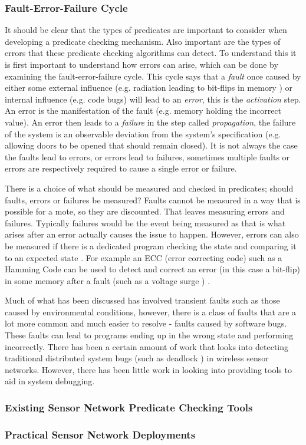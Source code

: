 \subsubsection*{Fault-Error-Failure Cycle}

It should be clear that the types of predicates are important to consider when developing a predicate checking mechanism. Also important are the types of errors that these predicate checking algorithms can detect. To understand this it is first important to understand how errors can arise, which can be done by examining the fault-error-failure cycle. This cycle says that a \emph{fault} once caused by either some external influence (e.g. radiation leading to bit-flips in memory \cite{1017791}) or internal influence (e.g. code bugs) will lead to an \emph{error}, this is the \emph{activation} step. An error is the manifestation of the fault (e.g. memory holding the incorrect value). An error then leads to a \emph{failure} in the step called \emph{propagation}, the failure of the system is an observable deviation from the system's specification (e.g. allowing doors to be opened that should remain closed). It is not always the case the faults lead to errors, or errors lead to failures, sometimes multiple faults or errors are respectively required to cause a single error or failure. \cite{1335465}

There is a choice of what should be measured and checked in predicates; should faults, errors or failures be measured? Faults cannot be measured \cite{?} in a way that is possible for a mote, so they are discounted. That leaves measuring errors and failures. Typically failures would be the event being measured \cite{?} as that is what arises after an error actually causes the issue to happen. However, errors can also be measured if there is a dedicated program checking the state and comparing it to an expected state \cite{?}. For example an ECC (error correcting code) such as a Hamming Code can be used to detect and correct an error (in this case a bit-flip) in some memory after a fault (such as a voltage surge ) \cite{hamming1950error}.

Much of what has been discussed has involved transient faults such as those caused by environmental conditions, however, there is a class of faults that are a lot more common and much easier to resolve - faults caused by software bugs. These faults can lead to programs ending up in the wrong state and performing incorrectly. There has been a certain amount of work that looks into detecting traditional distributed system bugs (such as deadlock \cite{5587352,5284172}) in wireless sensor networks. However, there has been little work in looking into providing tools to aid in system debugging.


\subsubsection*{Existing Sensor Network Predicate Checking Tools}


\subsubsection*{Practical Sensor Network Deployments}



